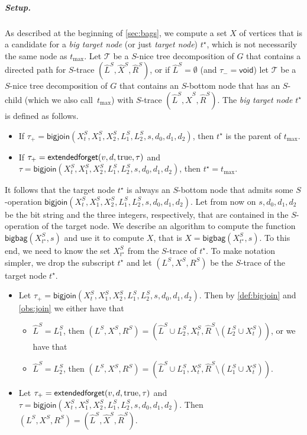 \documentclass[a4paper,UKenglish,cleveref, autoref, thm-restate, numberwithinsect]{lipics-v2021}
\newcounter{algorithm}
\newcommand{\bigjoin}{\mathsf{bigjoin}}
\newcommand{\extendedforget}{\mathsf{extendedforget}}
\newcommand{\void}{\mathsf{void}}
\newcommand{\bigbag}{\mathsf{bigbag}}
\newcommand{\true}{\textup{true}}
\newcommand{\slim}{\text{slim}\xspace}
\begin{document}
\subparagraph{Setup.} As described at the beginning of \cref{sec:bags}, we compute a set $X$ of vertices that is a candidate for a \emph{big target node} (or just \emph{target node}) $t^\star$, which is not necessarily the same node as $t_{\max}$. 
Let $\mathcal{T}$ be a \slim $S$-nice tree decomposition of $G$ that contains a directed path for $S$-trace $(\hat{L}^S, \hat{X}^S, \hat{R}^S)$, or if $\hat{L}^S=\emptyset$ (and $\tau_-=\void$) let $\mathcal{T}$ be a \slim $S$-nice tree decomposition of $G$ that contains an $S$-bottom node that has an $S$-child (which we also call~$t_{\max}$) with $S$-trace $(\hat{L}^S, \hat{X}^S, \hat{R}^S)$. 
The \emph{big target node} ${t^\star}$ is defined as follows.
\begin{itemize}
\item If $\tau_+=\bigjoin(X^S_t,X_1^S,X_2^S,L_{1}^S, L_{2}^S,s,d_0,d_1,d_2)$, then $t^\star$ is the parent of $t_{\max}$.
\item If $\tau_+=\extendedforget(v,d,\true,\tau)$ and $\tau=\bigjoin(X^S_t,X_1^S,X_2^S,L_{1}^S, L_{2}^S,s,d_0,d_1,d_2)$, then $t^\star=t_{\max}$.
\end{itemize}
It follows that the target node ${t^\star}$ is always an $S$-bottom node that admits some $S$-operation $\bigjoin(X^S_t,X_1^S,X_2^S,L_{1}^S, L_{2}^S,s,d_0,d_1,d_2)$. Let from now on $s,d_0,d_1,d_2$ be the bit string and the three integers, respectively, that are contained in the $S$-operation of the target node. We describe an algorithm to compute the function $\bigbag(X_{t^\star}^S,s)$ and use it to compute $X$, that is $X=\bigbag(X_{t^\star}^S,s)$. To this end, we need to know the set $X_{t^\star}^S$ from the $S$-trace of ${t^\star}$.
To make notation simpler, we drop the subscript ${t^\star}$ and let $(L^S, X^S, R^S)$ be the $S$-trace of the target node ${t^\star}$. 
\begin{itemize}
    \item 
    Let $\tau_+=\bigjoin(X^S_t,X_1^S,X_2^S,L_{1}^S, L_{2}^S,s,d_0,d_1,d_2)$. Then by \cref{def:bigjoin} and \cref{obs:join} we either have that 
\begin{itemize}
\item $\hat{L}^S=L_{1}^S$, then $(L^S, X^S, R^S)=(\hat{L}^S\cup L_{2}^S, X^S_t, \hat{R}^S\setminus (L_{2}^S\cup X^S_t))$, or we have that 
\item $\hat{L}^S=L_{2}^S$, then $(L^S, X^S, R^S)=(\hat{L}^S\cup L_{1}^S, X^S_t, \hat{R}^S\setminus (L_{1}^S\cup X^S_t))$.
\end{itemize}    
\item Let $\tau_+=\extendedforget(v,d,\true,\tau)$ and $\tau=\bigjoin(X^S_t,X_1^S,X_2^S,L_{1}^S, L_{2}^S,s,d_0,d_1,d_2)$. Then $(L^S, X^S, R^S)=(\hat{L}^S, \hat{X}^S, \hat{R}^S)$.  
\end{itemize}
\end{document}
